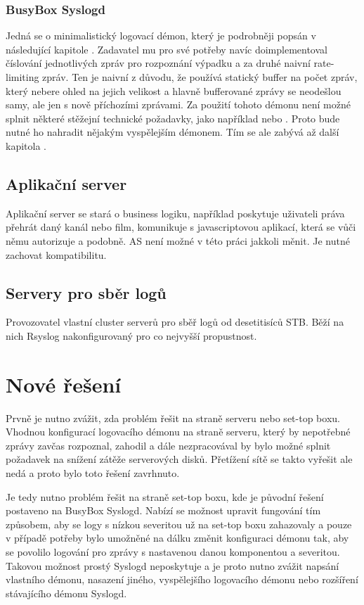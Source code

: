\documentclass[thesis=B,czech]{FITthesis}[2012/06/26]
\begin{document}
\subsubsection{BusyBox Syslogd}
Jedná se o minimalistický logovací démon, který je podrobněji popsán v následující kapitole .
Zadavatel mu pro své potřeby navíc doimplementoval číslování jednotlivých zpráv pro rozpoznání výpadku a za druhé naivní rate-limiting zpráv. Ten je naivní z důvodu, že používá statický buffer na počet zpráv, který nebere ohled na jejich velikost a hlavně bufferované zprávy se neodešlou samy, ale jen s nově příchozími zprávami.
Za použití tohoto démonu není možné splnit některé stěžejní technické požadavky, jako například  nebo . Proto bude nutné ho nahradit nějakým vyspělejším démonem. Tím se ale zabývá až další kapitola .

\subsection{Aplikační server}
Aplikační server se stará o business logiku, například poskytuje uživateli práva přehrát daný kanál nebo film, komunikuje s javascriptovou aplikací, která se vůči němu autorizuje a podobně.
AS není možné v této práci jakkoli měnit. Je nutné zachovat kompatibilitu.

\subsection{Servery pro sběr logů}
Provozovatel vlastní cluster serverů pro sběř logů od desetitisíců STB. Běží na nich Rsyslog nakonfigurovaný pro co nejvyšší propustnost.

\section{Nové řešení}
Prvně je nutno zvážit, zda problém řešit na straně serveru nebo set-top boxu. Vhodnou konfigurací logovacího démonu na straně serveru, který by nepotřebné zprávy zavčas rozpoznal, zahodil a dále nezpracovával by bylo možné splnit požadavek na snížení zátěže serverových disků. Přetížení sítě se takto vyřešit ale nedá a proto bylo toto řešení zavrhnuto.

Je tedy nutno problém řešit na straně set-top boxu, kde je původní řešení postaveno na BusyBox Syslogd. Nabízí se možnost upravit fungování tím způsobem, aby se logy s nízkou severitou už na set-top boxu zahazovaly a pouze v případě potřeby bylo umožněné na dálku změnit konfiguraci démonu tak, aby se povolilo logování pro zprávy s nastavenou danou komponentou a severitou. Takovou možnost prostý Syslogd neposkytuje a je proto nutno zvážit napsání vlastního démonu, nasazení jiného, vyspělejšího logovacího démonu nebo rozšíření stávajícího démonu Syslogd.
\end{document}
